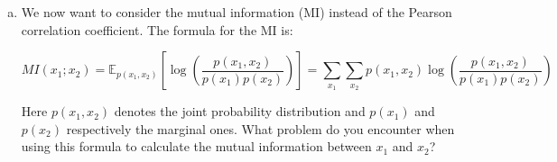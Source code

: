 {\begin{enumerate}[a)]
\begin{center}
\texttt{[image: figure/add\_Points\_x1\_x2.pdf]}
\end{center}

Based on your drawing, do you consider the Pearson correlation coefficient a reliable measure to 
detect dependencies for the above use case?


%
% 
%

\newpage

\item\label{MI_Aufgabe} We now want to consider the mutual information (MI) instead of the Pearson correlation coefficient.
The formula for the MI is:

\[
  	MI(x_1 ; x_2 ) =  \mathbb{E}_{p(x_1, x_2)} \left[ \log\left(\frac{p(x_1, x_2)}{p(x_1) p(x_2)} \right) \right] = \sum_{x_1} \sum_{x_2} p(x_1, x_2) \log\left(\frac{p(x_1, x_2)}{p(x_1) p(x_2)} \right) 
\]

Here \(p(x_1, x_2)\) denotes the joint probability distribution and \(p(x_1)\) and \(p(x_2)\) respectively the marginal ones.
What problem do you encounter when using this formula to calculate the mutual information between $x_1$ and $x_2$? 

\end{enumerate}
}

\dlz

